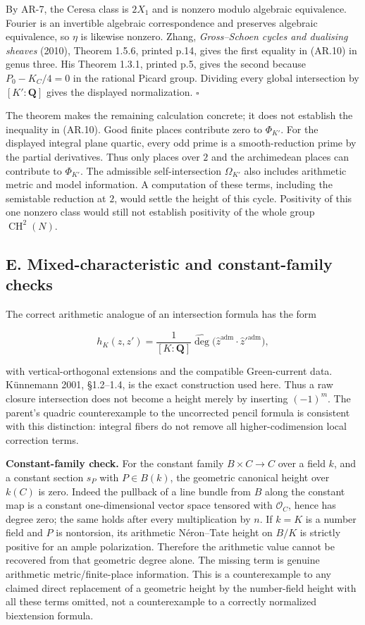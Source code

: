 \documentclass[11pt,a4paper]{article}
\begin{document}
By AR-7, the Ceresa class is \(2X_1\) and is nonzero modulo algebraic
equivalence. Fourier is an invertible algebraic correspondence and
preserves algebraic equivalence, so \(\eta\) is likewise nonzero. Zhang,
\emph{Gross--Schoen cycles and dualising sheaves} (2010), Theorem 1.5.6,
printed p.14, gives the first equality in (AR.10) in genus three. His
Theorem 1.3.1, printed p.5, gives the second because \(P_0-K_C/4=0\) in
the rational Picard group. Dividing every global intersection by
\([K':\mathbf Q]\) gives the displayed normalization. \(\square\)

The theorem makes the remaining calculation concrete; it does not
establish the inequality in (AR.10). Good finite places contribute zero
to \(\Phi_{K'}\). For the displayed integral plane quartic, every odd
prime is a smooth-reduction prime by the partial derivatives. Thus only
places over \(2\) and the archimedean places can contribute to
\(\Phi_{K'}\). The admissible self-intersection \(\Omega_{K'}\) also
includes arithmetic metric and model information. A computation of these
terms, including the semistable reduction at \(2\), would settle the
height of this cycle. Positivity of this one nonzero class would still
not establish positivity of the whole group \(\operatorname{CH}^2(N)\).

\subsection{E. Mixed-characteristic and constant-family
checks}\label{e.-mixed-characteristic-and-constant-family-checks}

The correct arithmetic analogue of an intersection formula has the form

\[
h_K(z,z')=\frac1{[K:\mathbf Q]}\widehat{\deg}
 \bigl(\widehat z^{\mathrm{adm}}\cdot\widehat z'^{\mathrm{adm}}\bigr),
\tag{AR.6}
\]

with vertical-orthogonal extensions and the compatible Green-current
data. Künnemann 2001, §1.2--1.4, is the exact construction used here.
Thus a raw closure intersection does not become a height merely by
inserting \((-1)^m\). The parent's quadric counterexample to the
uncorrected pencil formula is consistent with this distinction: integral
fibers do not remove all higher-codimension local correction terms.

\textbf{Constant-family check.} For the constant family
\(B\times C\to C\) over a field \(k\), and a constant section \(s_P\)
with \(P\in B(k)\), the geometric canonical height over \(k(C)\) is
zero. Indeed the pullback of a line bundle from \(B\) along the constant
map is a constant one-dimensional vector space tensored with
\(\mathcal O_C\), hence has degree zero; the same holds after every
multiplication by \(n\). If \(k=K\) is a number field and \(P\) is
nontorsion, its arithmetic Néron--Tate height on \(B/K\) is strictly
positive for an ample polarization. Therefore the arithmetic value
cannot be recovered from that geometric degree alone. The missing term
is genuine arithmetic metric/finite-place information. This is a
counterexample to any claimed direct replacement of a geometric height
by the number-field height with all these terms omitted, not a
counterexample to a correctly normalized biextension formula.
\end{document}

